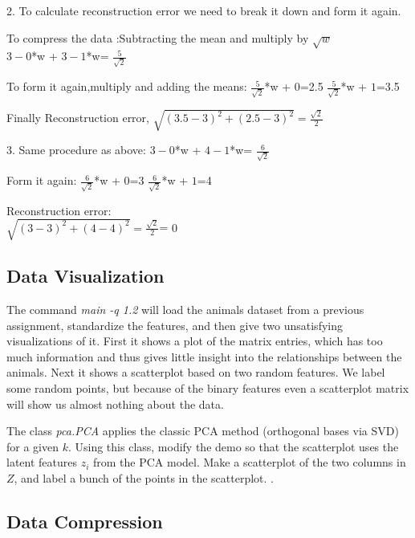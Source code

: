 \documentclass{article}
\begin{document}
2. To calculate reconstruction error we need to break it down and form it again.

To compress the data :Subtracting the mean and multiply by $\sqrt{w}$ \\
$3-0$*w + $3-1$*w= $\frac{5}{\sqrt{2}}$

To form it again,multiply and  adding the means:
$\frac{5}{\sqrt{2}}$*w + $0$=2.5
$\frac{5}{\sqrt{2}}$*w + $1$=3.5

Finally Reconstruction error,
$\sqrt{(3.5-3)^2 +(2.5-3)^2}=\frac{\sqrt{2}}{2}$

3. Same procedure as above:
$3-0$*w + $4-1$*w= $\frac{6}{\sqrt{2}}$
 
 Form it again:
 $\frac{6}{\sqrt{2}}$*w + $0$=3
$\frac{6}{\sqrt{2}}$*w + $1$=4

Reconstruction error:\\
$\sqrt{(3-3)^2 +(4-4)^2}=\frac{\sqrt{2}}{2}$= $0$





\subsection{Data Visualization}

The command \emph{main -q 1.2} will load the animals dataset from a previous assignment, standardize the features, and then give two unsatisfying visualizations of it. 
First it shows a plot of the matrix entries, which has too much information and thus gives little insight into the relationships between the animals. 
Next it shows a scatterplot based on two random features. 
We label some random points, but because of the binary features even a scatterplot matrix will show us almost nothing about the data.

The class \emph{pca.PCA} applies the classic PCA method (orthogonal bases via SVD) for a given $k$. 
Using this class, modify the demo so that the scatterplot uses the latent features $z_i$ from the PCA model. 
Make a scatterplot of the two columns in $Z$, and label a bunch of the points in the scatterplot. .\\

 

\subsection{Data Compression}
\end{document}
